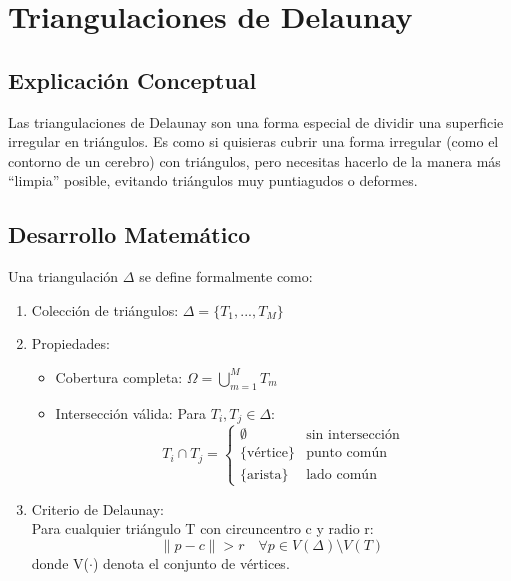 \documentclass[12pt,a4paper]{article}
\begin{document}
\section{Triangulaciones de Delaunay}

\subsection{Explicación Conceptual}
Las triangulaciones de Delaunay son una forma especial de dividir una superficie irregular en triángulos. Es como si quisieras cubrir una forma irregular (como el contorno de un cerebro) con triángulos, pero necesitas hacerlo de la manera más ``limpia'' posible, evitando triángulos muy puntiagudos o deformes.

\subsection{Desarrollo Matemático}
Una triangulación $\Delta$ se define formalmente como:

\begin{enumerate}
\item Colección de triángulos: $\Delta = \{T_1,...,T_M\}$

\item Propiedades:
  \begin{itemize}
  \item Cobertura completa: $\Omega = \bigcup_{m=1}^M T_m$
  \item Intersección válida: Para $T_i, T_j \in \Delta$:
    \begin{equation}
    T_i \cap T_j = \begin{cases} 
    \emptyset & \text{sin intersección} \\
    \{\text{vértice}\} & \text{punto común} \\
    \{\text{arista}\} & \text{lado común}
    \end{cases}
    \end{equation}
  \end{itemize}

\item Criterio de Delaunay:\\
  Para cualquier triángulo T con circuncentro c y radio r:
  \begin{equation}
  \|p - c\| > r \quad \forall p \in V(\Delta)\setminus V(T)
  \end{equation}
  donde V($\cdot$) denota el conjunto de vértices.
\end{enumerate}
\end{document}
